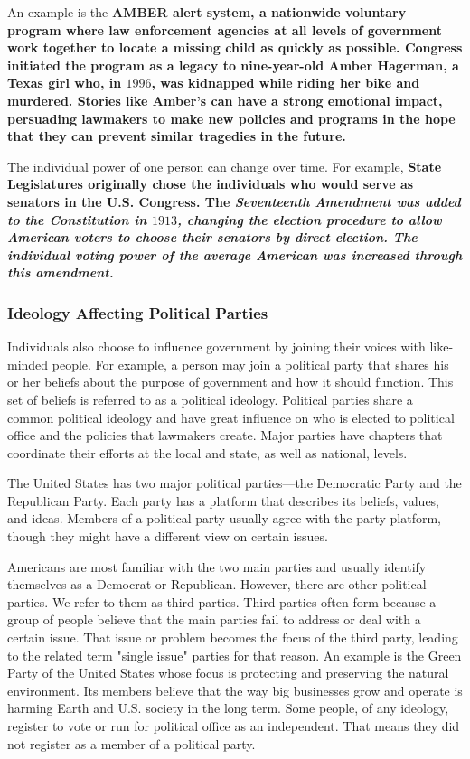 An example is the \bf{AMBER alert system}, a nationwide voluntary program where
law enforcement agencies at all levels of government work together to locate a
missing child as quickly as possible. \bf{Congress} initiated the program as a
legacy to nine-year-old \bf{Amber Hagerman}, a Texas girl who, in $1996$, was
kidnapped while riding her bike and murdered. Stories like \bf{Amber's} can have
a strong emotional impact, persuading lawmakers to make new policies and
programs in the hope that they can prevent similar tragedies in the future.

The individual power of one person can change over time. For example, \bf{State
Legislatures} originally chose the individuals who would serve as senators in
the \bf{U.S. Congress}. The \it{Seventeenth Amendment} was added to the
\bf{Constitution} in $1913$, changing the election procedure to allow American
voters to choose their senators by direct election. The individual voting power
of the average American was increased through this amendment.

\subsubsection*{Ideology Affecting Political Parties}

Individuals also choose to influence government by joining their voices with
like-minded people. For example, a person may join a political party that shares
his or her beliefs about the purpose of government and how it should function.
This set of beliefs is referred to as a political ideology. Political parties
share a common political ideology and have great influence on who is elected to
political office and the policies that lawmakers create. Major parties have
chapters that coordinate their efforts at the local and state, as well as
national, levels.

The United States has two major political parties—the Democratic Party and the
Republican Party. Each party has a platform that describes its beliefs, values,
and ideas. Members of a political party usually agree with the party platform,
though they might have a different view on certain issues.

Americans are most familiar with the two main parties and usually identify
themselves as a Democrat or Republican. However, there are other political
parties. We refer to them as third parties. Third parties often form because a
group of people believe that the main parties fail to address or deal with a
certain issue. That issue or problem becomes the focus of the third party,
leading to the related term "single issue" parties for that reason. An example
is the Green Party of the United States whose focus is protecting and preserving
the natural environment. Its members believe that the way big businesses grow
and operate is harming Earth and U.S. society in the long term. Some people, of
any ideology, register to vote or run for political office as an independent.
That means they did not register as a member of a political party.

